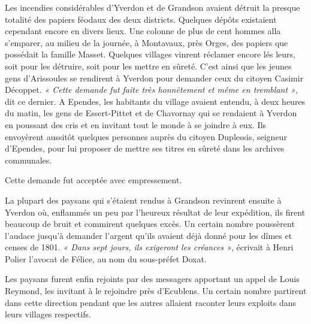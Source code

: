 \documentclass[french,twoside]{book} %
\begin{document}
Les incendies considérables d’Yverdon et de Grandson avaient détruit la presque totalité des papiers féodaux des deux districts. Quelques dépôts existaient cependant encore en divers lieux. Une colonne de plus de cent hommes alla s’emparer, au milieu de la journée, à Montavaux, près Orges, des papiers que possédait la famille Masset. Quelques villages vinrent réclamer encore lés leurs, soit pour les détruire, soit pour les mettre en sûreté. C’est ainsi que les jeunes gens d’Arissoules se rendirent à Yverdon pour demander ceux du citoyen Casimir Décoppet. \emph{« Cette demande fut faite très honnêtement et même en tremblant »}, dit ce dernier. A Ependes, les habitants du village avaient entendu, à deux heures du matin, les gens de Essert-Pittet et de Chavornay qui se rendaient à Yverdon en poussant des cris et en invitant tout le monde à se joindre à eux. Ils envoyèrent aussitôt quelques personnes auprès du citoyen Duplessis, seigneur d’Ependes, pour lui proposer de mettre ses titres en sûreté dans les archives communales.\par
Cette demande fut acceptée avec empressement.\par
La plupart des paysans qui s’étaient rendus à Grandson revinrent ensuite à Yverdon où, enflammés un peu par l’heureux résultat de leur expédition, ils firent beaucoup de bruit et commirent quelques excès. Un certain nombre poussèrent l’audace jusqu’à demander l’argent qu’ils avaient déjà donné pour les dîmes et censes de 1801. \emph{« Dans sept jours, ils exigeront les créances »}, écrivait à Henri Polier l’avocat de Félice, au nom du sous-préfet Doxat.\par
Les paysans furent enfin rejoints par des messagers apportant un appel de Louis Reymond, les invitant à le rejoindre près d’Ecublens. Un certain nombre partirent dans cette direction pendant que les autres allaient raconter leurs exploits dans leurs villages respectifs.
\end{document}
